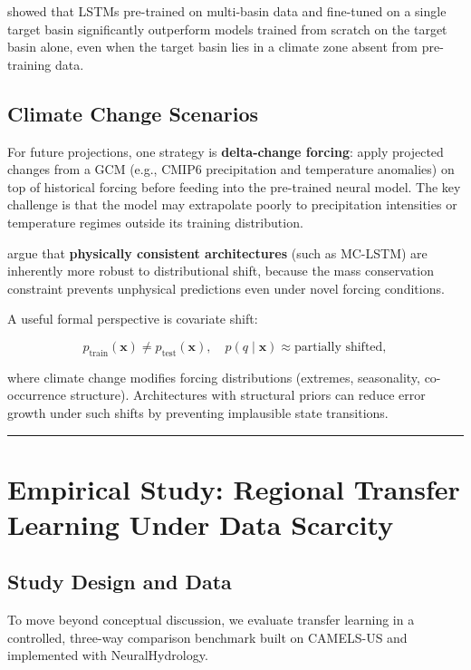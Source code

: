 \documentclass[
]{krantz}
\begin{document}
\citet{frame2022} showed that LSTMs pre-trained on multi-basin data and fine-tuned on a single
target basin significantly outperform models trained from scratch on the target basin
alone, even when the target basin lies in a climate zone absent from pre-training data.

\subsection{Climate Change Scenarios}\label{nh-climate-scenarios}

For future projections, one strategy is \textbf{delta-change forcing}: apply projected
changes from a GCM (e.g., CMIP6 precipitation and temperature anomalies) on top of
historical forcing before feeding into the pre-trained neural model. The key challenge
is that the model may extrapolate poorly to precipitation intensities or temperature
regimes outside its training distribution.

\citet{hoedt2021} argue that \textbf{physically consistent architectures} (such as MC-LSTM) are
inherently more robust to distributional shift, because the mass conservation
constraint prevents unphysical predictions even under novel forcing conditions.

A useful formal perspective is covariate shift:

\[
p_{\text{train}}(\mathbf{x}) \neq p_{\text{test}}(\mathbf{x}), \quad p(q\mid\mathbf{x}) \approx \text{partially shifted},
\]

where climate change modifies forcing distributions (extremes, seasonality,
co-occurrence structure). Architectures with structural priors can reduce error growth
under such shifts by preventing implausible state transitions.

\begin{center}\rule{0.5\linewidth}{0.5pt}\end{center}

\section{Empirical Study: Regional Transfer Learning Under Data Scarcity}\label{nh-case-study}

\subsection{Study Design and Data}\label{study-design-and-data}

To move beyond conceptual discussion, we evaluate transfer learning in a controlled,
three-way comparison benchmark built on CAMELS-US and implemented with NeuralHydrology.
\end{document}
